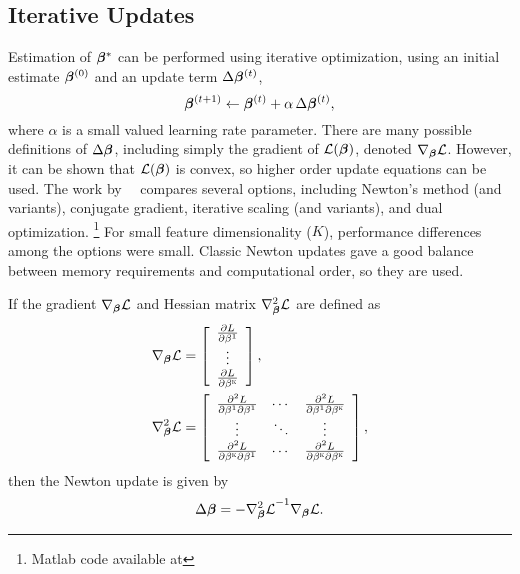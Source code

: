\subsection{Iterative Updates}
Estimation of $\bm{\beta}^*$ can be performed using iterative optimization,
using an initial estimate $\bm{\beta}^{(0)}$ and an update term $\Delta\bm{\beta}^{(t)}$,
\begin{equation}
  \bb^{(t+1)} \leftarrow \bb^{(t)} + \alpha\thinspace\Delta\bb^{(t)},%
  \label{eq:update}
\end{equation}
where $\alpha$ is a small valued learning rate parameter.
There are many possible definitions of $\Delta\bm{\beta}$,
including simply the gradient of $\mathcal{L}(\bm{\beta})$, denoted $\nabla_{\bm{\beta}}\mathcal{L}$.
However, it can be shown that $\mathcal{L}(\bm{\beta})$ is convex, so higher order update equations can be used.
The work by~\citeauthor{Minka2003}~\cite{Minka2003} compares several options,
including Newton's method (and variants),
conjugate gradient, iterative scaling (and variants), and dual optimization.%
\footnote{Matlab code available at }
For small feature dimensionality ($K$), performance differences among the options were small.
Classic Newton updates gave a good balance between memory requirements and computational order,
so they are used.
\par
If the gradient $\nabla_{\bm{\beta}}\mathcal{L}$ and Hessian matrix $\nabla^2_{\bm{\beta}}\mathcal{L}$ are defined as
\begin{align}
  \nabla_{\bb}\L   &= \left[\begin{array}{c}
                        \frac{\d L}{\d\b^1}\\\vdots\\\frac{\d L}{\d\b^\sk}
                      \end{array}\right],%
  \label{eq:llgradient0}\\
  \nabla^2_{\bb}\L &= \left[\begin{array}{ccc}
                        \frac{\d^2 L}{\d\b^1\d\b^1}   & \cdots & \frac{\d^2 L}{\d\b^1\d\b^\sk}\\
                                               \vdots & \ddots & \vdots \\
                        \frac{\d^2 L}{\d\b^\sk\d\b^1} & \cdots & \frac{\d^2 L}{\d\b^\sk\d\b^\sk}
                      \end{array}\right]%
  \label{eq:llhessian0},
\end{align}
then the Newton update is given by
\begin{equation}
  \Delta\bb = -{\nabla^2_{\bb}\L}^{-1}\nabla_{\bb}\L.%
  \label{eq:newtonmle}
\end{equation}
